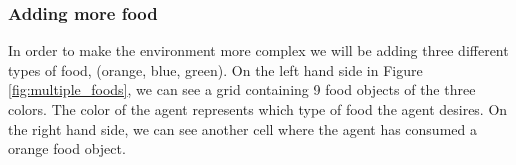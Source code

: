 \documentclass[12pt,A4]{report}
\theoremstyle{definition}
\begin{document}

\subsubsection{Adding more food}
In order to make the environment more complex we will be adding three different types of food, (orange, blue, green). On the left hand side in Figure \ref{fig:multiple_foods}, we can see a grid containing 9 food objects of the three colors. The color of the agent represents which type of food the agent desires. On the right hand side, we can see another cell where the agent has consumed a orange food object. 
\end{document}
